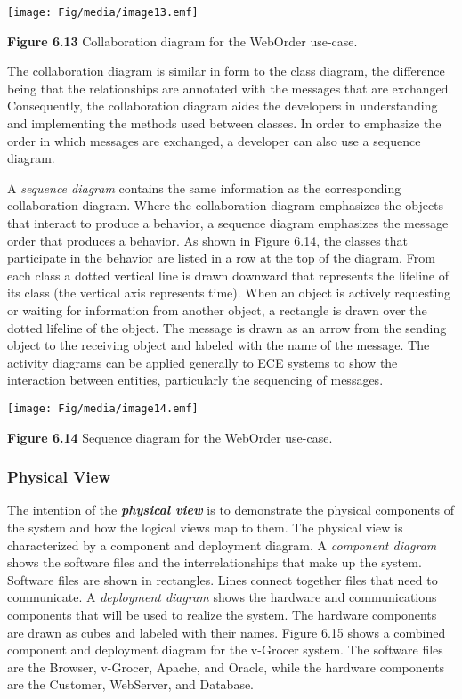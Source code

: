 \texttt{[image: Fig/media/image13.emf]}

\textbf{Figure 6.13} Collaboration diagram for the WebOrder use-case.

The collaboration diagram is similar in form to the class diagram, the
difference being that the relationships are annotated with the messages
that are exchanged. Consequently, the collaboration diagram aides the
developers in understanding and implementing the methods used between
classes. In order to emphasize the order in which messages are
exchanged, a developer can also use a sequence diagram.

A \emph{sequence diagram} contains the same information as the
corresponding collaboration diagram. Where the collaboration diagram
emphasizes the objects that interact to produce a behavior, a sequence
diagram emphasizes the message order that produces a behavior. As shown
in Figure 6.14, the classes that participate in the behavior are listed
in a row at the top of the diagram. From each class a dotted vertical
line is drawn downward that represents the lifeline of its class (the
vertical axis represents time). When an object is actively requesting or
waiting for information from another object, a rectangle is drawn over
the dotted lifeline of the object. The message is drawn as an arrow from
the sending object to the receiving object and labeled with the name of
the message. The activity diagrams can be applied generally to ECE
systems to show the interaction between entities, particularly the
sequencing of messages.

\texttt{[image: Fig/media/image14.emf]}

\textbf{Figure 6.14} Sequence diagram for the WebOrder use-case.

\subsubsection{Physical View}\label{physical-view}

The intention of the \emph{\textbf{physical view}} is to demonstrate the
physical components of the system and how the logical views map to them.
The physical view is characterized by a component and deployment
diagram. A \emph{component diagram} shows the software files and the
interrelationships that make up the system. Software files are shown in
rectangles. Lines connect together files that need to communicate. A
\emph{deployment diagram} shows the hardware and communications
components that will be used to realize the system. The hardware
components are drawn as cubes and labeled with their names. Figure 6.15
shows a combined component and deployment diagram for the v-Grocer
system. The software files are the Browser, v-Grocer, Apache, and
Oracle, while the hardware components are the Customer, WebServer, and
Database.

